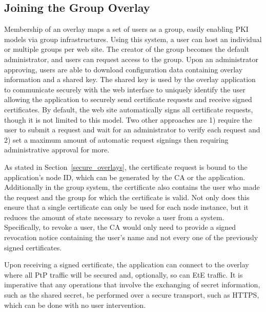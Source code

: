 \subsection{Joining the Group Overlay}
Membership of an overlay maps a set of users as a group, easily enabling PKI
models via group infrastructures.  Using this system, a user can host an
individual or multiple groups per web site.  The creator of the group becomes
the default administrator, and users can request access to the group.  Upon an
administrator approving, users are able to download configuration data
containing overlay information and a shared key.  The shared key is used by the
overlay application to communicate securely with the web interface to uniquely
identify the user allowing the application to securely send certificate
requests and receive signed certificates.  By default, the web site
automatically signs all certificate requests, though it is not limited to this
model.  Two other approaches are 1) require the user to submit a request and
wait for an administrator to verify each request and 2) set a maximum amount of
automatic request signings then requiring administrative approval for more.

As stated in Section~\ref{secure_overlays}, the certificate request is bound
to the application's node ID, which can be generated by the CA or the
application.  Additionally in the group system, the certificate also contains
the user who made the request and the group for which the certificate is valid.
Not only does this ensure that a single certificate can only be used for each
node instance, but it reduces the amount of state necessary to revoke a user
from a system.  Specifically, to revoke a user, the CA would only need to
provide a signed revocation notice containing the user's name and not every one
of the previously signed certificates.

Upon receiving a signed certificate, the application can connect to the overlay
where all PtP traffic will be secured and, optionally, so can EtE traffic.  It
is imperative that any operations that involve the exchanging of secret
information, such as the shared secret, be performed over a secure transport,
such as HTTPS, which can be done with no user intervention.

